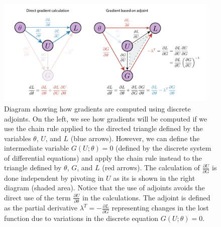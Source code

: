 \begin{figure}[t]
    \centering
    \includegraphics[width=0.95\textwidth]{figures/discrete_adjoint.pdf}
    \caption{Diagram showing how gradients are computed using discrete adjoints. On the left, we see how gradients will be computed if we use the chain rule applied to the directed triangle defined by the variables $\theta$, $U$, and $L$ (blue arrows). However, we can define the intermediate variable $G(U; \theta) = 0$ (defined by the discrete system of differential equations) and apply the chain rule instead to the triangle defined by $\theta$, $G$, and $L$ (red arrows). The calculation of $\frac{\partial U}{\partial G}$ is done independent by pivoting in $U$ as its is shown in the right diagram (shaded area). Notice that the use of adjoints avoids the direct use of the term $\frac{\partial U}{\partial \theta}$ in the calculations. The adjoint is defined as the partial derivative $\lambda^T = - \frac{\partial L}{\partial G}$ representing changes in the lost function due to variations in the discrete equation $G(U; \theta) = 0$. 
    }
    \label{fig:discrete-adjoint}
\end{figure}


